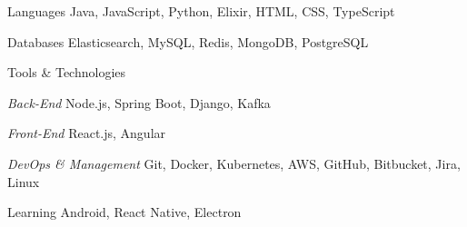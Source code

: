
\begin{cvskills}
    \cvskill
    {Languages} %
    {Java, JavaScript, Python, Elixir, HTML, CSS, TypeScript } %

    \cvskill
    {Databases} %
    { Elasticsearch, MySQL, Redis, MongoDB, PostgreSQL }

    \cvskill
    {Tools \& Technologies} %
    {}

    \cvskill
    {\textnormal{\textit{Back-End}}}
    {Node.js, Spring Boot, Django, Kafka}

    \cvskill
    {\textnormal{\textit{Front-End}}}
    {React.js, Angular}

    \cvskill
    {\textnormal{\textit{DevOps \& Management }}}
    { Git, Docker, Kubernetes, AWS, GitHub, Bitbucket, Jira, Linux}

    \cvskill
    {Learning}
    { Android, React Native, Electron }
\end{cvskills}